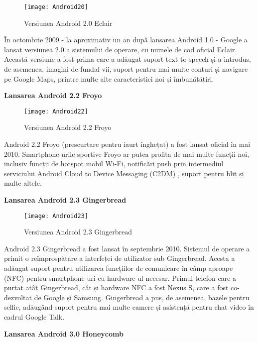 \documentclass[a4paper]{article}
\begin{document}
\begin{figure}[h]
	\centering
	\texttt{[image: Android20]} \\
	\caption{Versiunea Android 2.0 Eclair}
	\label{fig:Android20}
\end{figure}
\par
În octombrie 2009 - la aproximativ un an după lansarea Android 1.0 - Google a lansat versiunea 2.0 a sistemului de operare, cu numele de cod oficial Eclair. Această versiune a fost prima care a adăugat suport text-to-speech și a introdus, de asemenea, imagini de fundal vii, suport pentru mai multe conturi și navigare pe Google Maps, printre multe alte caracteristici noi și îmbunătățiri.
\clearpage
\begin{center}
	\large\textbf{Lansarea Android 2.2 Froyo}
\end{center}

\begin{figure}[h]
	\centering
	\texttt{[image: Android22]} \\
	\caption{Versiunea Android 2.2 Froyo}
	\label{fig:Android22}
\end{figure}
\par
Android 2.2 Froyo (prescurtare pentru iaurt înghețat) a fost lansat oficial în mai 2010. Smartphone-urile sportive Froyo ar putea profita de mai multe funcții noi, inclusiv funcții de hotspot mobil Wi-Fi, notificări push prin intermediul serviciului Android Cloud to Device Messaging (C2DM) , suport pentru bliț și multe altele.
\begin{center}
	\large\textbf{Lansarea Android 2.3 Gingerbread}
\end{center}

\begin{figure}[h]
	\centering
	\texttt{[image: Android23]} \\
	\caption{Versiunea Android 2.3 Gingerbread}
	\label{fig:Android23}
\end{figure}
\par
Android 2.3 Gingerbread a fost lansat în septembrie 2010. Sistemul de operare a primit o reîmprospătare a interfeței de utilizator sub Gingerbread. Acesta a adăugat suport pentru utilizarea funcțiilor de comunicare în câmp aproape (NFC) pentru smartphone-uri cu hardware-ul necesar. Primul telefon care a purtat atât Gingerbread, cât și hardware NFC a fost Nexus S, care a fost co-dezvoltat de Google și Samsung. Gingerbread a pus, de asemenea, bazele pentru selfie, adăugând suport pentru mai multe camere și asistență pentru chat video în cadrul Google Talk.
\clearpage
\begin{center}
	\large\textbf{Lansarea Android 3.0 Honeycomb}
\end{center}
\end{document}
